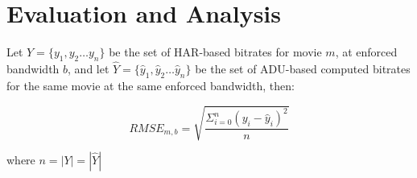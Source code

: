 \chapter{Evaluation and Analysis}\label{sec:results}


Let $Y=\{y_1, y_2 \dots y_n\}$ be the set of HAR-based bitrates for movie $m$, at enforced bandwidth
$b$, and let $\hat{Y}=\{\hat{y}_1, \hat{y}_2 \dots \hat{y}_n\}$ be the set of ADU-based computed bitrates for the same
movie at the same enforced bandwidth, then:

\begin{equation*}
    RMSE_{m, b} = \sqrt{\dfrac{\Sigma_{i=0}^{n}(y_i - \hat{y}_i)^2}{n}}
\end{equation*}

where $n = |Y| = |\hat{Y}|$ 

